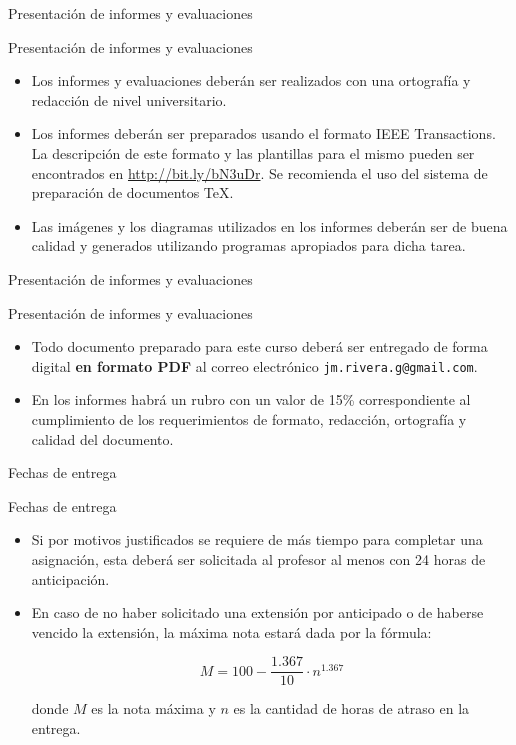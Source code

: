 \documentclass[xcolor=dvipsnames]{beamer}
\begin{document}
\begin{frame}{Presentación de informes y evaluaciones}
\begin{block}{Presentación de informes y evaluaciones}
  \begin{itemize}[<+->]
    \item Los informes y evaluaciones deberán ser realizados con una ortografía y redacción de nivel universitario.
    \item Los informes deberán ser preparados usando el formato IEEE Transactions. La descripción de este formato y las plantillas para el mismo pueden ser encontrados en \url{http://bit.ly/bN3uDr}. Se recomienda el uso del sistema de preparación de documentos \TeX. 
    \item Las imágenes y los diagramas utilizados en los informes deberán ser de buena calidad y generados utilizando programas apropiados para dicha tarea.
  \end{itemize}
\end{block}
\end{frame}


\begin{frame}{Presentación de informes y evaluaciones}
\begin{block}{Presentación de informes y evaluaciones}
  \begin{itemize}[<+->]
    \item Todo documento preparado para este curso deberá ser entregado de forma digital \textbf{en formato PDF} al correo electrónico \texttt{jm.rivera.g@gmail.com}.
    \item En los informes habrá un rubro con un valor de 15\% correspondiente al cumplimiento de los requerimientos de formato, redacción, ortografía y calidad del documento.
  \end{itemize}
\end{block}
\end{frame}

\begin{frame}{Fechas de entrega}

\begin{block}{Fechas de entrega}
  \begin{itemize}[<+->]
    \item Si por motivos justificados se requiere de más tiempo para completar una asignación, esta deberá ser solicitada al profesor al menos con 24 horas de anticipación.
    \item En caso de no haber solicitado una extensión por anticipado o de haberse vencido la extensión, la máxima nota estará dada por la fórmula:

      \[ M = 100-\frac{1.367}{10}\cdot n^{1.367} \]

    donde $M$ es la nota máxima y $n$ es la cantidad de horas de atraso en la entrega.
  \end{itemize}
\end{block}
\end{frame}
\end{document}
